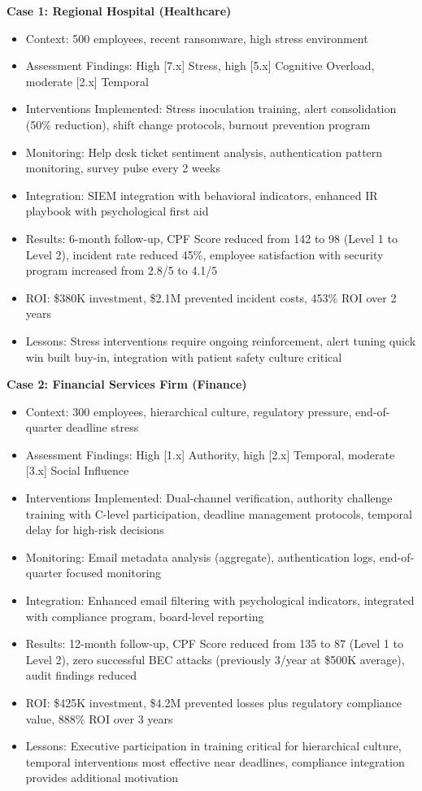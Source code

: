 \documentclass[11pt,a4paper]{article}
\begin{document}
\textbf{Case 1: Regional Hospital (Healthcare)}
\begin{itemize}
\item Context: 500 employees, recent ransomware, high stress environment
\item Assessment Findings: High [7.x] Stress, high [5.x] Cognitive Overload, moderate [2.x] Temporal
\item Interventions Implemented: Stress inoculation training, alert consolidation (50\% reduction), shift change protocols, burnout prevention program
\item Monitoring: Help desk ticket sentiment analysis, authentication pattern monitoring, survey pulse every 2 weeks
\item Integration: SIEM integration with behavioral indicators, enhanced IR playbook with psychological first aid
\item Results: 6-month follow-up, CPF Score reduced from 142 to 98 (Level 1 to Level 2), incident rate reduced 45\%, employee satisfaction with security program increased from 2.8/5 to 4.1/5
\item ROI: \$380K investment, \$2.1M prevented incident costs, 453\% ROI over 2 years
\item Lessons: Stress interventions require ongoing reinforcement, alert tuning quick win built buy-in, integration with patient safety culture critical
\end{itemize}

\textbf{Case 2: Financial Services Firm (Finance)}
\begin{itemize}
\item Context: 300 employees, hierarchical culture, regulatory pressure, end-of-quarter deadline stress
\item Assessment Findings: High [1.x] Authority, high [2.x] Temporal, moderate [3.x] Social Influence
\item Interventions Implemented: Dual-channel verification, authority challenge training with C-level participation, deadline management protocols, temporal delay for high-risk decisions
\item Monitoring: Email metadata analysis (aggregate), authentication logs, end-of-quarter focused monitoring
\item Integration: Enhanced email filtering with psychological indicators, integrated with compliance program, board-level reporting
\item Results: 12-month follow-up, CPF Score reduced from 135 to 87 (Level 1 to Level 2), zero successful BEC attacks (previously 3/year at \$500K average), audit findings reduced
\item ROI: \$425K investment, \$4.2M prevented losses plus regulatory compliance value, 888\% ROI over 3 years
\item Lessons: Executive participation in training critical for hierarchical culture, temporal interventions most effective near deadlines, compliance integration provides additional motivation
\end{itemize}
\end{document}
